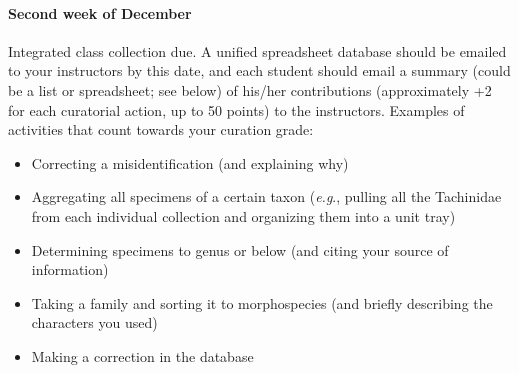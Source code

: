 \documentclass[letterpaper, 11pt]{article}
\begin{document}
\paragraph{Second week of December} Integrated class collection due. A unified spreadsheet database should be emailed to your instructors by this date, and each student should email a summary (could be a list or spreadsheet; see below) of his/her contributions (approximately +2 for each curatorial action, up to 50 points) to the instructors. Examples of activities that count towards your curation grade:
\begin{itemize}
\item Correcting a misidentification (and explaining why)
\item Aggregating all specimens of a certain taxon (\textit{e.g}., pulling all the Tachinidae from each individual collection and organizing them into a unit tray)
\item Determining specimens to genus or below (and citing your source of information)
\item Taking a family and sorting it to morphospecies (and briefly describing the characters you used)
\item Making a correction in the database
\end{itemize}
\end{document}

